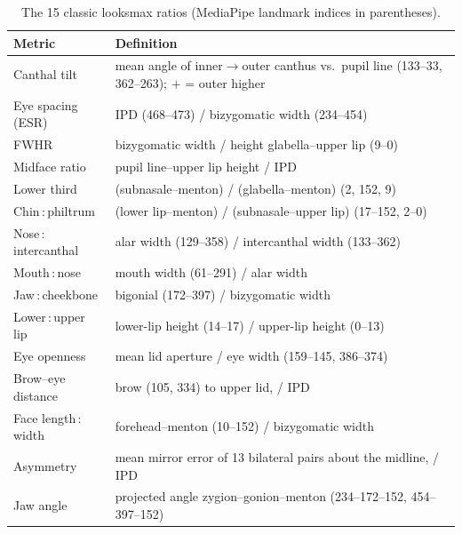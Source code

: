 \documentclass[sigconf,nonacm]{acmart}
\begin{document}
\begin{table}[t]
\caption{The 15 classic looksmax ratios (MediaPipe landmark indices in parentheses).}
\label{tab:metrics}
\footnotesize
\begin{tabularx}{\linewidth}{@{}lX@{}}
\toprule
Metric & Definition \\
\midrule
Canthal tilt & mean angle of inner$\rightarrow$outer canthus vs.\ pupil line (133--33, 362--263); $+$ = outer higher \\
Eye spacing (ESR) & IPD (468--473) / bizygomatic width (234--454) \\
FWHR & bizygomatic width / height glabella--upper lip (9--0) \\
Midface ratio & pupil line--upper lip height / IPD \\
Lower third & (subnasale--menton) / (glabella--menton) (2, 152, 9) \\
Chin\,:\,philtrum & (lower lip--menton) / (subnasale--upper lip) (17--152, 2--0) \\
Nose\,:\,intercanthal & alar width (129--358) / intercanthal width (133--362) \\
Mouth\,:\,nose & mouth width (61--291) / alar width \\
Jaw\,:\,cheekbone & bigonial (172--397) / bizygomatic width \\
Lower\,:\,upper lip & lower-lip height (14--17) / upper-lip height (0--13) \\
Eye openness & mean lid aperture / eye width (159--145, 386--374) \\
Brow--eye distance & brow (105, 334) to upper lid, / IPD \\
Face length\,:\,width & forehead--menton (10--152) / bizygomatic width \\
Asymmetry & mean mirror error of 13 bilateral pairs about the midline, / IPD \\
Jaw angle & projected angle zygion--gonion--menton (234--172--152, 454--397--152) \\
\bottomrule
\end{tabularx}
\end{table}
\end{document}
